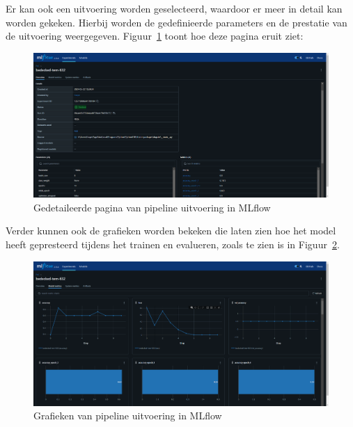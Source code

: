 Er kan ook een uitvoering worden geselecteerd, waardoor er meer in detail kan worden gekeken. Hierbij worden de gedefinieerde parameters en de prestatie van de uitvoering weergegeven. Figuur~\ref{fig:MLflow_informatie} toont hoe deze pagina eruit ziet:

\begin{figure}[h]
    \centering
    \includegraphics[width=0.9\linewidth]{graphics/MLflow_Information.PNG}
    \caption{Gedetaileerde pagina van pipeline uitvoering in MLflow}
    \label{fig:MLflow_informatie}
\end{figure}

Verder kunnen ook de grafieken worden bekeken die laten zien hoe het model heeft gepresteerd tijdens het trainen en evalueren, zoals te zien is in Figuur~\ref{fig:MLflow_graph}.

\begin{figure}[h]
    \centering
    \includegraphics[width=0.9\linewidth]{graphics/mlflow_Graph.PNG}
    \caption{Grafieken van pipeline uitvoering in MLflow}
    \label{fig:MLflow_graph}
\end{figure}